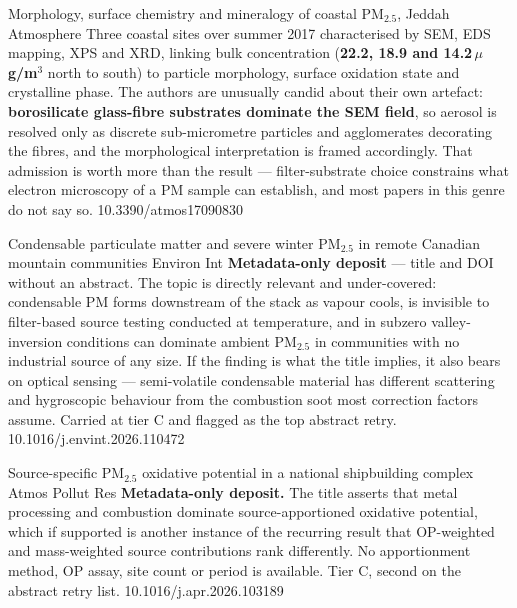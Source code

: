 \documentclass[10pt]{article}
\begin{document}
{Morphology, surface chemistry and mineralogy of coastal PM$_{2.5}$, Jeddah}
{Atmosphere}
{Three coastal sites over summer 2017 characterised by SEM, EDS mapping, XPS and XRD,
linking bulk concentration (\textbf{22.2, 18.9 and 14.2\,$\mu$g/m$^3$} north to south)
to particle morphology, surface oxidation state and crystalline phase. The authors are
unusually candid about their own artefact: \textbf{borosilicate glass-fibre substrates
dominate the SEM field}, so aerosol is resolved only as discrete sub-micrometre particles
and agglomerates decorating the fibres, and the morphological interpretation is framed
accordingly. That admission is worth more than the result --- filter-substrate choice
constrains what electron microscopy of a PM sample can establish, and most papers in this
genre do not say so.}
{10.3390/atmos17090830}


{Condensable particulate matter and severe winter PM$_{2.5}$ in remote Canadian mountain communities}
{Environ Int}
{\textbf{Metadata-only deposit} --- title and DOI without an abstract. The topic is
directly relevant and under-covered: condensable PM forms downstream of the stack as
vapour cools, is invisible to filter-based source testing conducted at temperature, and
in subzero valley-inversion conditions can dominate ambient PM$_{2.5}$ in communities
with no industrial source of any size. If the finding is what the title implies, it also
bears on optical sensing --- semi-volatile condensable material has different scattering
and hygroscopic behaviour from the combustion soot most correction factors assume.
Carried at tier C and flagged as the top abstract retry.}
{10.1016/j.envint.2026.110472}

{Source-specific PM$_{2.5}$ oxidative potential in a national shipbuilding complex}
{Atmos Pollut Res}
{\textbf{Metadata-only deposit.} The title asserts that metal processing and combustion
dominate source-apportioned oxidative potential, which if supported is another instance
of the recurring result that OP-weighted and mass-weighted source contributions rank
differently. No apportionment method, OP assay, site count or period is available.
Tier C, second on the abstract retry list.}
{10.1016/j.apr.2026.103189}

\clearpage

\end{document}
